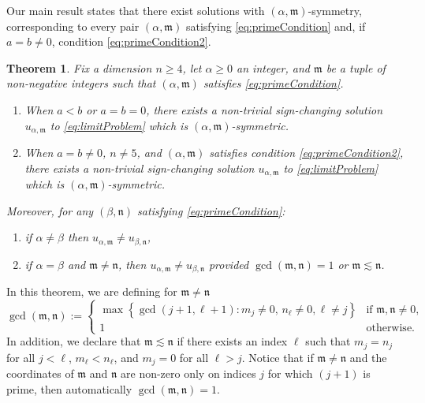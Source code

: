 \documentclass[10pt, reqno]{amsart}
\newcommand{\m}{\mathfrak{m}}
\newcommand{\n}{\mathfrak{n}}
\numberwithin{equation}{section}
\theoremstyle{definition}
\theoremstyle{remark}
\theoremstyle{plain}
\newtheorem{thm}{Theorem}
\begin{document}
	
	Our main result states that there exist solutions with $(\alpha,\m)$-symmetry, corresponding to every pair $(\alpha,\m)$ satisfying \eqref{eq:primeCondition} and, if $a=b\ne0$, condition \eqref{eq:primeCondition2}.
	
	
	
	\begin{thm}\label{thm:main}
		Fix a dimension $n\ge 4$, let $\alpha \ge 0$ an integer, and $\m$ be a tuple of non-negative integers such that $(\alpha,\m)$ satisfies \eqref{eq:primeCondition}.
		\begin{enumerate}
			\item  When $a < b$ or $a=b=0$, there exists a non-trivial sign-changing solution $u_{\alpha,\m}$ to \eqref{eq:limitProblem} which is $(\alpha,\m)$-symmetric.
			\item  When $a =b \ne 0$, $n \ne 5$, and $(\alpha,\m)$ satisfies condition \eqref{eq:primeCondition2}, there exists a non-trivial sign-changing solution $u_{\alpha,\m}$ to \eqref{eq:limitProblem} which is $(\alpha,\m)$-symmetric.
		\end{enumerate}
		Moreover, for any $(\beta,\n)$ satisfying \eqref{eq:primeCondition}:
		\begin{enumerate}[label=(\roman*)]
			\item if $\alpha \ne \beta$ then $u_{\alpha,\m} \ne u_{\beta,\n}$,
			\item if $\alpha = \beta$ and $\m \ne \n$, then $u_{\alpha,\m} \ne u_{\beta,\n}$ provided $\gcd(\m,\n) =1$ or $\m \lesssim \n$.
		\end{enumerate}
	\end{thm}
	
	In this theorem, we are defining for $\m \ne \n$ 
	\begingroup
	\small
	\begin{equation}
		\gcd(\m,\n) := \begin{cases} 
			\max\left\{  \gcd(j+1, \ell + 1) : m_j \ne 0,\, n_\ell \ne 0, \ell\ne j  \right\} & \text{if $\m, \n \ne 0$,}\\
			1 & \text{otherwise}.
		\end{cases}
	\end{equation}
	\endgroup
	In addition, we  declare that $\m \lesssim \n$ if there exists an index $\ell$ such that $m_j = n_j$ for all $j < \ell$, $m_\ell < n_\ell$, and $m_j = 0$ for all $\ell > j$. Notice that if $\m \ne \n$ and the coordinates of $\m$ and $\n$ are non-zero only on indices $j$ for which $(j+1)$ is prime, then automatically $\gcd(\m,\n) = 1$.
	
\end{document}
